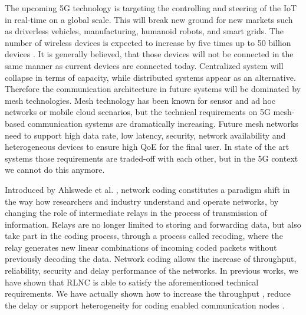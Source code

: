 %

The upcoming 5G technology is targeting the controlling and steering of the \ac{IoT} in real-time on a global scale. This will break new ground for new markets such as driverless vehicles, manufacturing, humanoid robots, and smart grids. The number of wireless devices is expected to increase by five times up to 50 billion devices \cite{cisco2011forecast}. It is generally believed, that those devices will not be connected in the same manner as current devices are connected today. Centralized system will collapse in terms of capacity, while distributed systems appear as an alternative. Therefore the communication architecture in future systems will be dominated by mesh technologies. Mesh technology has been known for sensor and ad hoc networks or mobile cloud scenarios, but the technical requirements on 5G mesh-based communication systems are dramatically increasing. Future mesh networks need to support high data rate, low latency, security, network availability and heterogeneous devices to ensure high \ac{QoE} for the final user. In state of the art systems those requirements are traded-off with each other, but in the 5G context we cannot do this anymore.

Introduced by Ahlswede et al. \cite{ahlswede2000network}, network coding constitutes a paradigm shift in the way how researchers and industry understand and operate networks, by changing the role of intermediate relays in the process of transmission of information. Relays are no longer limited to storing and forwarding data, but also take part in the coding process, through a process called recoding, where the relay generates new linear combinations of incoming coded packets without previously decoding the data. Network coding allows the increase of throughput, reliability, security and delay performance of the networks. In previous works, we have shown that \ac{RLNC} \cite{koetter2003algebraic,ho2006random} is able to satisfy the aforementioned technical requirements. We have actually shown how to increase the throughput \cite{pahlevani2013playncool}, reduce the delay \cite{szabo2015towards} or support heterogeneity for coding enabled communication nodes \cite{lucani2014fulcrum}.

